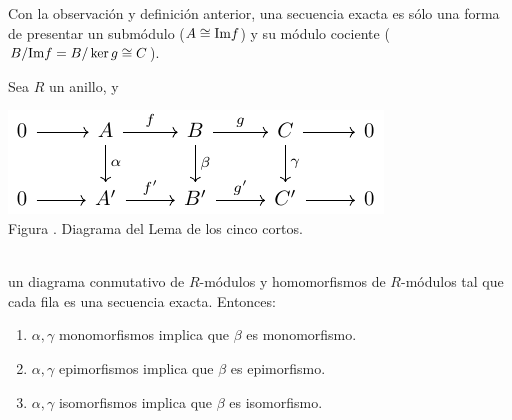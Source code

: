 \documentclass[12pt]{report}
\newcounter{it}
\theoremstyle{largebreak}
\newcommand{\im}{\ensuremath{\textup{Im}}}
\begin{document}
    Con la observación y definición anterior, una secuencia exacta es sólo una forma de presentar un submódulo ($A\cong \im f$) y su módulo cociente ($B/\im f=B/\ker g\cong C$).

\setcounter{figcount}{1}

    \begin{lema}
        Sea $R$ un anillo, y
        
        \begin{minipage}{\textwidth}
            \begin{center}
                \includegraphics[scale=1.5]{images/fig_1.pdf}\\
                Figura \thefigcount. Diagrama del Lema de los cinco cortos.
            \end{center}
        \end{minipage}
        \\

        un diagrama conmutativo de $R$-módulos y homomorfismos de $R$-módulos tal que cada fila es una secuencia exacta. Entonces:
        \begin{enumerate}[label = \textit{(\alph*)}]
            \item $\alpha,\gamma$ monomorfismos implica que $\beta$ es monomorfismo.
            \item $\alpha,\gamma$ epimorfismos implica que $\beta$ es epimorfismo.
            \item $\alpha,\gamma$ isomorfismos implica que $\beta$ es isomorfismo.
        \end{enumerate}
    \end{lema}
\end{document}
